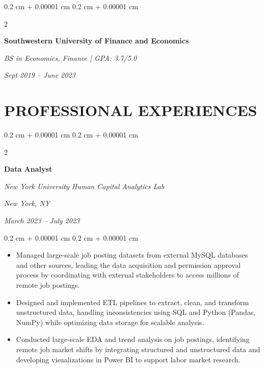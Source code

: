 \documentclass[10pt, letterpaper]{article}
\newenvironment{highlights}{
    \begin{itemize}[
        topsep=0.05 cm,
        parsep=0.05 cm,
        partopsep=0pt,
        itemsep=0pt,
        leftmargin=0.4 cm + 10pt
    ]
}{
    \end{itemize}
} %
\newenvironment{onecolentry}{
    \begin{adjustwidth}{
        0.2 cm + 0.00001 cm
    }{
        0.2 cm + 0.00001 cm
    }
}{
    \end{adjustwidth}
} %
\newenvironment{twocolentry}[2][]{
    \onecolentry
    \def\secondColumn{#2}
    \setcolumnwidth{\fill, 4.5 cm}
    \begin{paracol}{2}
}{
    \switchcolumn \raggedleft \secondColumn
    \end{paracol}
    \endonecolentry
} %
\begin{document}
        \vspace{0.20 cm}

        \begin{twocolentry}{
        \textit{Sept 2019 – June 2023}}
            \textbf{Southwestern University of Finance and Economics}
        
            \textit{BS in Economics, Finance | GPA: 3.7/5.0}  
        \end{twocolentry}
        
    \section{PROFESSIONAL EXPERIENCES}

        \begin{twocolentry}{
        \textit{New York, NY}    
            
        \textit{March 2023 – July 2023}}
            \textbf{Data Analyst}
            
            \textit{New York University Human Capital Analytics Lab}
            
        \end{twocolentry}

        \vspace{0.10 cm}
        \begin{onecolentry}
            \begin{highlights}
                \item Managed large-scale job posting datasets from external MySQL databases and other sources, leading the data acquisition and permission approval process by coordinating with external stakeholders to access millions of remote job postings.
                \item Designed and implemented ETL pipelines to extract, clean, and transform unstructured data, handling inconsistencies using SQL and Python (Pandas, NumPy) while optimizing data storage for scalable analysis.  
                \item Conducted large-scale EDA and trend analysis on job postings, identifying remote job market shifts by integrating structured and unstructured data and developing visualizations in Power BI to support labor market research.
            \end{highlights}
        \end{onecolentry}
        
        \vspace{0.2 cm}
        
\end{document}
